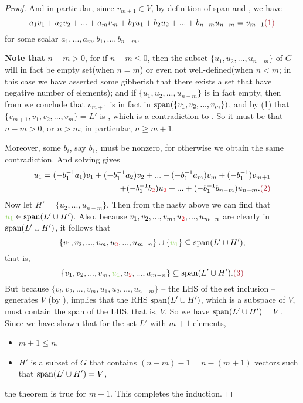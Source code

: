 \begin{proof}
And in particular, since \(v_{m + 1} \in V\), by definition of span and , we have
\[
    a_1 v_1 + a_2 v_2 + ... + a_m v_m + b_1 u_1 + b_2 u_2 + ... + b_{n - m} u_{n - m} = v_{m + 1} \MAROON{(1)}
\]
for some scalar \(a_1, ..., a_m, b_1, ..., b_{n - m}\).

\textbf{Note that} \(n - m > 0\), for if \(n - m \le 0\), then the subset \(\{ u_1, u_2, ..., u_{n - m} \}\) of \(G\) will in fact be empty set(when \(n = m\)) or even not well-defined(when \(n < m\); in this case we have asserted some gibberish that there exists a set that have negative number of elements);
and if \(\{ u_1, u_2, ..., u_{n - m} \}\) is in fact empty, then from  we conclude that \(v_{m + 1}\) is in fact in \(\operatorname{span}(\{ v_1, v_2, ..., v_m \})\), and by (1) that \(\{ v_{m + 1}, v_1, v_2, ..., v_m \} = L'\) is \LDP{}, which is a contradiction to \BLUE{(*)}.
So it must be that \(n - m > 0\), or \(n > m\);
in particular, \(n \ge m + 1\).

Moreover, some \(b_i\), say \(b_1\), must be nonzero, for otherwise we obtain the same contradiction.
And solving  gives
\begin{align*}
    u_1 = (-b_1^{-1} a_1) v_1 + (-b_1^{-1} a_2) v_2 + ... + (-b_1^{-1} a_m) v_m + (-b_1^{-1}) v_{m + 1} \\
        + (-b_1^{-1} b_{\RED{2}}) u_{\RED{2}} + ... + (-b^{-1}_1 b_{n - m}) u_{n - m}. \MAROON{(2)}
\end{align*}
Now let \(H' = \{ u_2, ..., u_{n - m} \}\).
Then from the nasty  above we can find that \(\GREEN{u_1} \in \spann(L' \cup H')\).
Also, because \(v_1, v_2, ..., v_m, u_{\RED{2}}, ..., u_{m - n}\) are clearly in \(\operatorname{span}(L' \cup H')\), it follows that
\[
    \{ v_1, v_2, ..., v_m, u_{\RED{2}}, ..., u_{m - n}\} \cup \{ \GREEN{u_1} \} \subseteq \spann(L' \cup H');
\]
that is,
\[
    \{ v_1, v_2, ..., v_m, \GREEN{u_1}, u_{\RED{2}}, ..., u_{m - n}\} \subseteq \spann(L' \cup H'). \MAROON{(3)}
\]
But because \(\{ v_l, v_2, ..., v_m, u_1, u_2, ..., u_{n - m} \}\) -- the LHS of the set inclusion  -- generates \(V\) (by ),
 implies that the RHS \(\operatorname{span}(L' \cup H')\), which is a subspace of \(V\), must contain the span of the LHS, that is, \(V\).
So we have \(\operatorname{span}(L' \cup H') = V\).
Since we have shown that for the \LID{} set \(L'\) with \(m + 1\) elements,
\begin{itemize}
    \item \(m + 1 \le n\),
    \item \(H'\) is a subset of \(G\) that contains \((n - m) - 1 = n - (m + 1)\) vectors such that \(\operatorname{span}(L' \cup H') = V\),
\end{itemize}
the theorem is true for \(m + 1\).
This completes the induction.
\end{proof}

